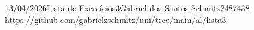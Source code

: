 \documentclass{article}
\begin{document}
{13/04/2026}{Lista de Exercícios}{3}{Gabriel dos Santos Schmitz}{2487438}
{https://github.com/gabrielzschmitz/uni/tree/main/al/lista3}




\newpage
\printbibliography\
\end{document}
